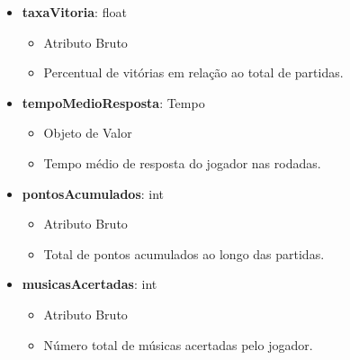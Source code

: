\begin{itemize}
        \item \textbf{taxaVitoria}: float  
              \begin{itemize}
                  \item Atributo Bruto
                  \item Percentual de vitórias em relação ao total de partidas.
              \end{itemize}
    
        \item \textbf{tempoMedioResposta}: Tempo  
              \begin{itemize}
                  \item Objeto de Valor
                  \item Tempo médio de resposta do jogador nas rodadas.
              \end{itemize}
    
        \item \textbf{pontosAcumulados}: int  
              \begin{itemize}
                  \item Atributo Bruto
                  \item Total de pontos acumulados ao longo das partidas.
              \end{itemize}
    
        \item \textbf{musicasAcertadas}: int  
              \begin{itemize}
                  \item Atributo Bruto
                  \item Número total de músicas acertadas pelo jogador.
              \end{itemize}
    \end{itemize}
    
